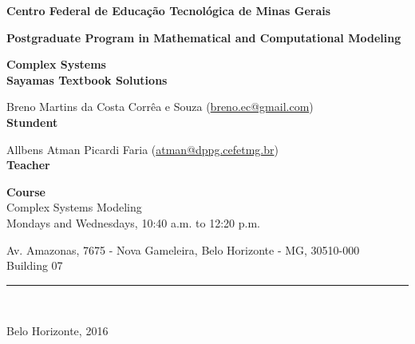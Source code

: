 
\hypersetup{pageanchor=false}

\begin{titlepage}
  \begin{center}
    {\large
    \textbf{Centro Federal de Educação Tecnológica de Minas Gerais}
    }

    \vspace{0.5cm}

    {\normalsize
    \textbf{Postgraduate Program in Mathematical and Computational Modeling}
    }

    \vspace{2.5cm}

    {\LARGE \textbf{Complex Systems}} \\
    \vspace{0.5cm}
    {\Large \textbf{Sayama\textquotesingle s Textbook Solutions}}

    \vspace{3.5cm}
  \end{center}

  Breno Martins da Costa Corrêa e Souza
  (\href{mailto:breno.ec@gmail.com}{breno.ec@gmail.com}) \\
  \indent \textbf{Stundent}

  \vspace{1cm}

  Allbens Atman Picardi Faria
  (\href{mailto:atman@dppg.cefetmg.br}{atman@dppg.cefetmg.br}) \\
  \indent \textbf{Teacher}

  \vspace{1cm}

  \begin{center}
    \textbf{Course} \\
    Complex Systems Modeling \\
    Mondays and Wednesdays, 10:40 a.m. to 12:20 p.m. \\

    \vspace{1cm}

    Av.  Amazonas, 7675 - Nova Gameleira, Belo Horizonte - MG, 30510-000 \\
    Building 07 \\

    \vspace{3.5cm}

    \rule[1pt]{360pt}{1pt} \\

    \vspace{0.5cm}

    Belo Horizonte, 2016

  \end{center}

  \pagebreak
\end{titlepage}

\hypersetup{pageanchor=true}
